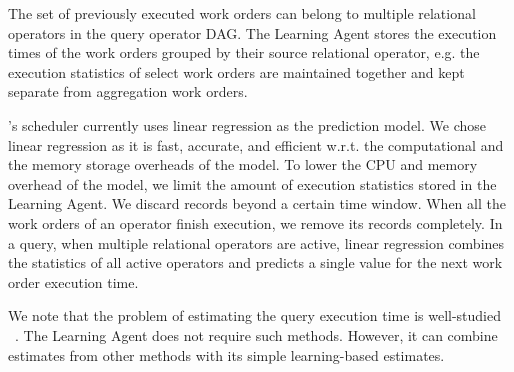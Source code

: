 The set of previously executed work orders can belong to multiple relational operators in the query operator DAG. 
The Learning Agent stores the execution times of the work orders grouped by their source relational operator, e.g. the execution statistics of select work orders are maintained together and kept separate from aggregation work orders. 

\sys{}'s scheduler currently uses linear regression as the prediction model.
We chose linear regression as it is fast, accurate, and efficient w.r.t. the computational and the memory storage overheads of the model. 
To lower the CPU and memory overhead of the model, we limit the amount of execution statistics stored in the Learning Agent.
We discard records beyond a certain time window. 
When all the work orders of an operator finish execution, we remove its records completely. 
In a query, when multiple relational operators are active, 
linear regression combines the statistics of all active operators and predicts a single 
value for the next work order execution time.

We note that the problem of estimating the query execution time is well-studied 
~\cite{duggan2011performance, wu2013towards, li2012gslpi, 
chaudhuri2004estimating}. 
The Learning Agent does not require such methods. 
However, it can combine estimates from other methods with its simple learning-based estimates.

